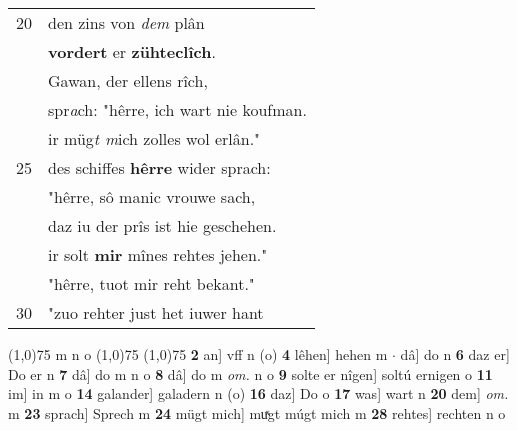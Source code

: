 \documentclass[8pt,a4paper,notitlepage]{article}
\begin{document}
\begin{table}[ht]
\begin{minipage}[t]{0.5\linewidth}
\begin{tabular}{rl}
20 & den zins von \textit{dem} plân\\ 
 & \textbf{vordert} er \textbf{zühteclîch}.\\ 
 & Gawan, der ellens rîch,\\ 
 & spr\textit{a}ch: "hêrre, ich wart nie koufman.\\ 
 & ir müg\textit{t m}ich zolles wol erlân."\\ 
25 & des schiffes \textbf{hêrre} wider sprach:\\ 
 & "hêrre, sô manic vrouwe sach,\\ 
 & daz iu der prîs ist hie geschehen.\\ 
 & ir solt \textbf{mir} mînes rehtes jehen."\\ 
 & "hêrre, tuot mir reht bekant."\\ 
30 & "zuo rehter just het iuwer hant\\ 
\end{tabular}
\scriptsize
\line(1,0){75} \newline
m n o \newline
\line(1,0){75} \newline
\newline
\line(1,0){75} \newline
\textbf{2} an] vff n (o) \textbf{4} lêhen] hehen m  $\cdot$ dâ] do n \textbf{6} daz er] Do er n \textbf{7} dâ] do m n o \textbf{8} dâ] do m \textit{om.} n o \textbf{9} solte er nîgen] soltú ernigen o \textbf{11} im] in m o \textbf{14} galander] galadern n (o) \textbf{16} daz] Do o \textbf{17} was] wart n \textbf{20} dem] \textit{om.} m \textbf{23} sprach] Sprech m \textbf{24} mügt mich] muͯgt múgt mich m \textbf{28} rehtes] rechten n o \newline
\end{minipage}
\end{table}
\newpage
\end{document}
